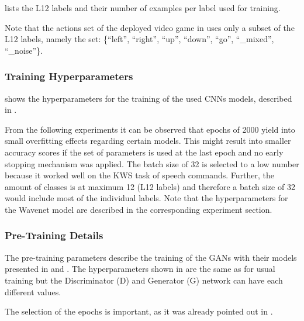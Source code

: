  lists the L12 labels and their number of examples per label used for training.

Note that the actions set of the deployed video game in  uses only a subset of the L12 labels, namely the set: \{\enquote{left},  \enquote{right}, \enquote{up}, \enquote{down}, \enquote{go}, \enquote{\_mixed}, \enquote{\_noise}\}.



\subsubsection{Training Hyperparameters}
 shows the hyperparameters for the training of the used CNNs models, described in .

From the following experiments it can be observed that epochs of 2000 yield into small overfitting effects regarding certain models.
This might result into smaller accuracy scores if the set of parameters is used at the last epoch and no early stopping mechanism was applied.
The batch size of 32 is selected to a low number because it worked well on the KWS task of speech commands.
Further, the amount of classes is at maximum 12 (L12 labels) and therefore a batch size of 32 would include most of the individual labels.
Note that the hyperparameters for the Wavenet model are described in the corresponding experiment section.



\subsubsection{Pre-Training Details}
The pre-training parameters describe the training of the GANs with their models presented in  and .
The hyperparameters shown in  are the same as for usual training but the Discriminator (D) and Generator (G) network can have each different values.

The selection of the epochs is important, as it was already pointed out in .



